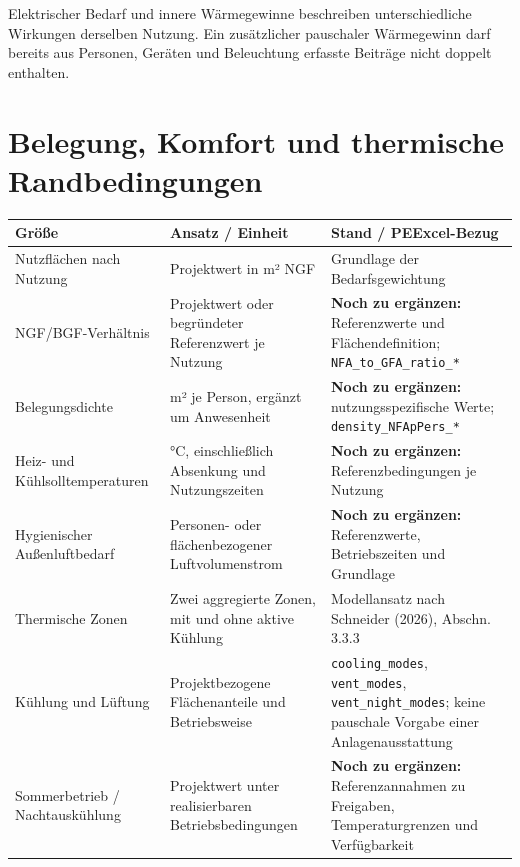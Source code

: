 \documentclass[
  ngerman,
  a4paper,
  DIV=11]{scrreprt}
\newcounter{none} %
\begin{document}
Elektrischer Bedarf und innere Wärmegewinne beschreiben unterschiedliche
Wirkungen derselben Nutzung. Ein zusätzlicher pauschaler Wärmegewinn
darf bereits aus Personen, Geräten und Beleuchtung erfasste Beiträge
nicht doppelt enthalten.

\section{Belegung, Komfort und thermische
Randbedingungen}\label{belegung-komfort-und-thermische-randbedingungen}

{\def\LTcaptype{none} %
\begin{longtable}[]{@{}
  >{\raggedright\arraybackslash}p{}
  >{\raggedright\arraybackslash}p{}
  >{\raggedright\arraybackslash}p{}@{}}
\toprule\noalign{}
\begin{minipage}[b]{\linewidth}\raggedright
Größe
\end{minipage} & \begin{minipage}[b]{\linewidth}\raggedright
Ansatz / Einheit
\end{minipage} & \begin{minipage}[b]{\linewidth}\raggedright
Stand / PEExcel-Bezug
\end{minipage} \\
\midrule\noalign{}
\endhead
\bottomrule\noalign{}
\endlastfoot
Nutzflächen nach Nutzung & Projektwert in m² NGF & Grundlage der
Bedarfsgewichtung \\
NGF/BGF-Verhältnis & Projektwert oder begründeter Referenzwert je
Nutzung & \textbf{Noch zu ergänzen:} Referenzwerte und
Flächendefinition; \texttt{NFA\_to\_GFA\_ratio\_*} \\
Belegungsdichte & m² je Person, ergänzt um Anwesenheit & \textbf{Noch zu
ergänzen:} nutzungsspezifische Werte; \texttt{density\_NFApPers\_*} \\
Heiz- und Kühlsolltemperaturen & °C, einschließlich Absenkung und
Nutzungszeiten & \textbf{Noch zu ergänzen:} Referenzbedingungen je
Nutzung \\
Hygienischer Außenluftbedarf & Personen- oder flächenbezogener
Luftvolumenstrom & \textbf{Noch zu ergänzen:} Referenzwerte,
Betriebszeiten und Grundlage \\
Thermische Zonen & Zwei aggregierte Zonen, mit und ohne aktive Kühlung &
Modellansatz nach Schneider (2026), Abschn. 3.3.3 \\
Kühlung und Lüftung & Projektbezogene Flächenanteile und Betriebsweise &
\texttt{cooling\_modes}, \texttt{vent\_modes},
\texttt{vent\_night\_modes}; keine pauschale Vorgabe einer
Anlagenausstattung \\
Sommerbetrieb / Nachtauskühlung & Projektwert unter realisierbaren
Betriebsbedingungen & \textbf{Noch zu ergänzen:} Referenzannahmen zu
Freigaben, Temperaturgrenzen und Verfügbarkeit \\
\end{longtable}
}
\end{document}

